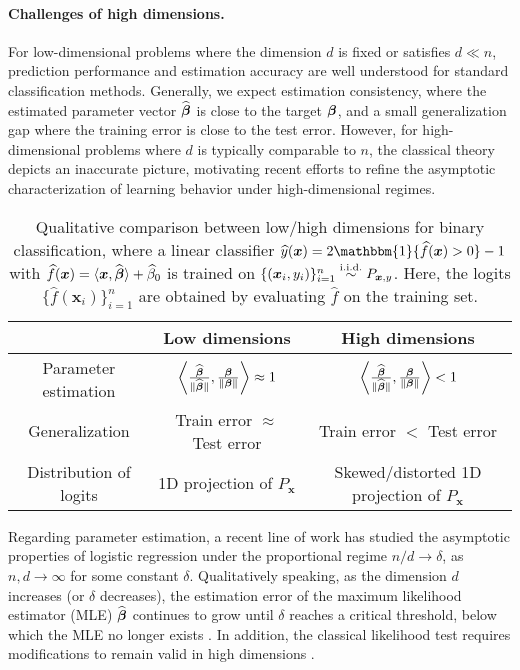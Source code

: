 \paragraph{Challenges of high dimensions.}  For low-dimensional problems where the dimension $d$ is fixed or satisfies $d \ll n$, prediction performance and estimation accuracy are well understood for standard classification methods. Generally, we expect estimation consistency, where the estimated parameter vector $\widehat {{\boldsymbol{\beta}}}$ is close to the target ${\boldsymbol{\beta}}$, and a small generalization gap where the training error is close to the test error. However, for high-dimensional problems where $d$ is typically comparable to $n$, the classical theory depicts an inaccurate picture, motivating recent efforts to refine the asymptotic characterization of learning behavior under high-dimensional regimes.

\begin{table}[h!]
\centering
\begin{tabular}{c|c|c}
   & \textbf{Low dimensions}        & \textbf{High dimensions}   \\ 
   \hline
   \rule[-1ex]{0pt}{4ex}
Parameter estimation                                           & $\left\langle \frac{\widehat {{\boldsymbol{\beta}}}}{\| \widehat {{\boldsymbol{\beta}}}\|}, \frac{{\boldsymbol{\beta}}}{\| {\boldsymbol{\beta}} \|} \right\rangle \approx 1$ & $\left\langle \frac{\widehat {{\boldsymbol{\beta}}}}{\| \widehat {{\boldsymbol{\beta}}}\|}, \frac{{\boldsymbol{\beta}}}{\| {\boldsymbol{\beta}} \|} \right\rangle < 1$ \\
Generalization       & Train error $\approx$ Test error                       & Train error $<$ Test error   \\
Distribution of logits & 1D projection of $P_{\boldsymbol{x}}$   & Skewed/distorted 1D projection of $P_{\boldsymbol{x}}$
\end{tabular}
\caption{Qualitative comparison between low/high dimensions for binary classification, where a linear classifier $\hat{y} (\xx) = 2 \mathbbm{1}\{ \hat f(\vx) > 0\} - 1$ with $\widehat f({\boldsymbol{x}}) = \langle {\boldsymbol{x}}, \widehat {{\boldsymbol{\beta}}} \rangle + \widehat \beta_0$ is trained on $\{({\boldsymbol{x}}_i, y_i)\}_{i=1}^n \stackrel{\mathrm{i.i.d.}}{\sim} P_{{\boldsymbol{x}}, y}$. Here, the logits $\{\hat f(\boldsymbol{x}_i)\}_{i = 1}^n $ are obtained by evaluating $\hat{f}$ on the training set.}\label{tab:1}
\end{table}    


Regarding parameter estimation, a recent line of work \cite{dobriban2018high, Pragya_highdim_logistic, sur2019logistic, candes2020logistic, montanari2023generalizationerrormaxmarginlinear} has studied the asymptotic properties of logistic regression under the proportional regime $n / d \to \delta$, as $n, d \to \infty$ for some constant $\delta$. Qualitatively speaking, as the dimension $d$ increases (or $\delta$ decreases), the estimation error of the maximum likelihood estimator (MLE) $\widehat {{\boldsymbol{\beta}}}$ continues to grow until $\delta$ reaches a critical threshold, below which the MLE no longer exists \cite{Pragya_highdim_logistic, sur2019logistic, candes2020logistic}. In addition, the classical likelihood test requires modifications to remain valid in high dimensions \cite{Pragya_highdim_logistic, sur2019logistic, candes2020logistic}. 

